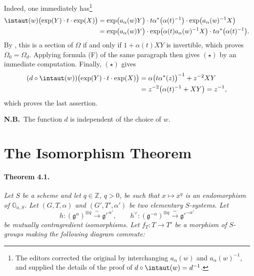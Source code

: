 Indeed, one immediately has\footnote{The editors corrected the
original by interchanging \(a_\alpha(w)\) and
\(a_\alpha(w)^{-1}\), and supplied the details of the proof of
\(d\circ\intaut(w)=d^{-1}\).}
\[
\begin{aligned}
  \intaut(w)\bigl(\exp(Y)\cdot t\cdot\exp(X)\bigr)
   &=
   \exp\bigl(a_\alpha(w)Y\bigr)\cdot
   t\alpha^\ast\bigl(\alpha(t)^{-1}\bigr)\cdot
   \exp\bigl(a_\alpha(w)^{-1}X\bigr)\\
   &=
   \exp\bigl(a_\alpha(w)Y\bigr)\cdot
   \exp\bigl(\alpha(t)a_\alpha(w)^{-1}X\bigr)\cdot
   t\alpha^\ast\bigl(\alpha(t)^{-1}\bigr).
\end{aligned}
\]
By , this is a section of \(\Omega\) if and only if
\(1+\alpha(t)XY\) is invertible, which proves
\(\Omega_0=\Omega_d\).  Applying formula \textup{(F)} of the same
paragraph then gives \((\star)\) by an immediate computation.
Finally, \((\star)\) gives
\[
\begin{aligned}
  (d\circ\intaut(w))
    \bigl(\exp(Y)\cdot t\cdot\exp(X)\bigr)
   &=
   \alpha\bigl(t\alpha^\ast(z)\bigr)^{-1}
     +z^{-2}XY\\
   &=z^{-2}\bigl(\alpha(t)^{-1}+XY\bigr)
    =z^{-1},
\end{aligned}
\]
which proves the last assertion.

\smallskip
\noindent\textbf{N.B.}\ The function \(d\) is independent of the
choice of \(w\).

\section{The Isomorphism Theorem}

\paragraph{\textbf{Theorem 4.1.}}
\emph{Let \(S\) be a scheme and let \(q\in\mathbb Z\), \(q>0\), be
such that \(x\mapsto x^q\) is an endomorphism of
\(\mathbb G_{a,S}\).  Let \((G,T,\alpha)\) and
\((G',T',\alpha')\) be two elementary \(S\)-systems.  Let}
\[
  h\colon(\mathfrak g^\alpha)^{\otimes q}
      \xrightarrow{\ \sim\ }\mathfrak g'^{\,\alpha'},
  \qquad
  h^\vee\colon(\mathfrak g^{-\alpha})^{\otimes q}
      \xrightarrow{\ \sim\ }\mathfrak g'^{-\alpha'}
\]
\emph{be mutually contragredient isomorphisms.  Let
\(f_T\colon T\to T'\) be a morphism of \(S\)-groups making the
following diagram commute:}

\begin{center}
\end{center}

